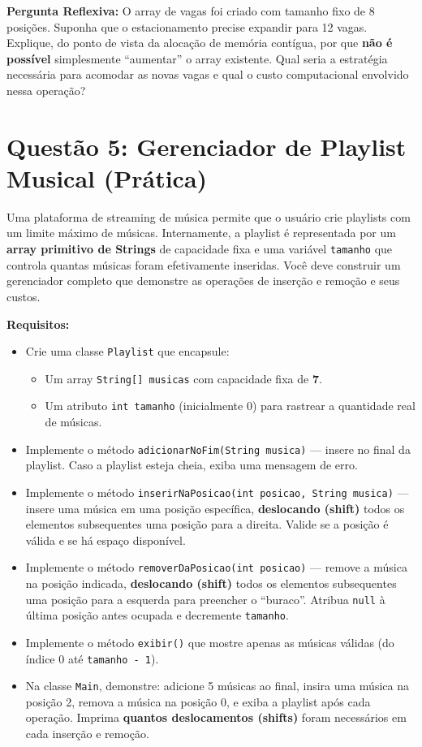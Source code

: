 \documentclass[12pt, a4paper]{article}
\begin{document}
\textbf{Pergunta Reflexiva:} O array de vagas foi criado com tamanho fixo de 8 posições. Suponha que o estacionamento precise expandir para 12 vagas. Explique, do ponto de vista da alocação de memória contígua, por que \textbf{não é possível} simplesmente ``aumentar'' o array existente. Qual seria a estratégia necessária para acomodar as novas vagas e qual o custo computacional envolvido nessa operação?

\vspace{0.2cm}

\section*{Questão 5: Gerenciador de Playlist Musical (Prática)}
Uma plataforma de streaming de música permite que o usuário crie playlists com um limite máximo de músicas. Internamente, a playlist é representada por um \textbf{array primitivo de Strings} de capacidade fixa e uma variável \texttt{tamanho} que controla quantas músicas foram efetivamente inseridas. Você deve construir um gerenciador completo que demonstre as operações de inserção e remoção e seus custos.

\textbf{Requisitos:}
\begin{itemize}
    \item Crie uma classe \texttt{Playlist} que encapsule:
    \begin{itemize}
        \item Um array \texttt{String[] musicas} com capacidade fixa de \textbf{7}.
        \item Um atributo \texttt{int tamanho} (inicialmente 0) para rastrear a quantidade real de músicas.
    \end{itemize}
    \item Implemente o método \texttt{adicionarNoFim(String musica)} — insere no final da playlist. Caso a playlist esteja cheia, exiba uma mensagem de erro.
    \item Implemente o método \texttt{inserirNaPosicao(int posicao, String musica)} — insere uma música em uma posição específica, \textbf{deslocando (shift)} todos os elementos subsequentes uma posição para a direita. Valide se a posição é válida e se há espaço disponível.
    \item Implemente o método \texttt{removerDaPosicao(int posicao)} — remove a música na posição indicada, \textbf{deslocando (shift)} todos os elementos subsequentes uma posição para a esquerda para preencher o ``buraco''. Atribua \texttt{null} à última posição antes ocupada e decremente \texttt{tamanho}.
    \item Implemente o método \texttt{exibir()} que mostre apenas as músicas válidas (do índice 0 até \texttt{tamanho - 1}).
    \item Na classe \texttt{Main}, demonstre: adicione 5 músicas ao final, insira uma música na posição 2, remova a música na posição 0, e exiba a playlist após cada operação. Imprima \textbf{quantos deslocamentos (shifts)} foram necessários em cada inserção e remoção.
\end{itemize}
\end{document}

